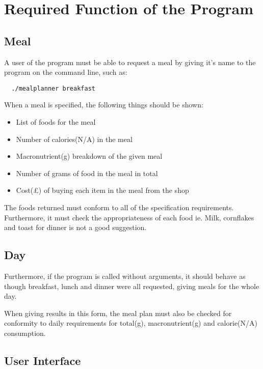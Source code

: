 \documentclass[a4paper]{article}
\begin{document}
\section{Required Function of the Program}

\subsection{Meal}

A user of the program must be able to request a meal by giving it's name 
to the program on the command line, such as:

\begin{verbatim}
  ./mealplanner breakfast
\end{verbatim}

When a meal is specified, the following things should be shown:

\begin{itemize}
  \item List of foods for the meal
  \item Number of calories(N/A) in the meal
  \item Macronutrient(g) breakdown of the given meal
  \item Number of grams of food in the meal in total
  \item Cost(£) of buying each item in the meal from the shop
\end{itemize}

The foods returned must conform to all of the specification 
requirements. Furthermore, it must check the appropriateness of each 
food ie. Milk, cornflakes and toast for dinner is not a good suggestion.

\subsection{Day}

Furthermore, if the program is called without arguments, it should 
behave as though breakfast, lunch and dinner were all requested, giving 
meals for the whole day.

When giving results in this form, the meal plan must also be checked for 
conformity to daily requirements for total(g), macronutrient(g) and 
calorie(N/A) consumption.

\subsection{User Interface}
\end{document}
